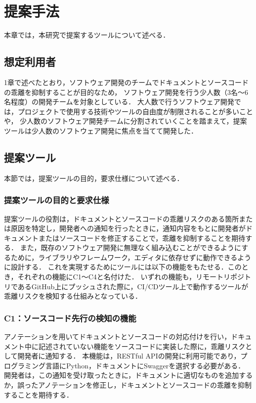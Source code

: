 \chapter{提案手法}
本章では，本研究で提案するツールについて述べる．

\section{想定利用者}
1章で述べたとおり，ソフトウェア開発のチームでドキュメントとソースコードの乖離を抑制することが目的なため，
ソフトウェア開発を行う少人数（3名〜6名程度）の開発チームを対象としている．
大人数で行うソフトウェア開発では，プロジェクトで使用する技術やツールの自由度が制限されることが多いことや，
少人数のソフトウェア開発チームに分割されていくことを踏まえて，提案ツールは少人数のソフトウェア開発に焦点を当てて開発した．

\section{提案ツール}
\label{tool}
本節では，提案ツールの目的，要求仕様について述べる．

\subsection{提案ツールの目的と要求仕様}
提案ツールの役割は，ドキュメントとソースコードの乖離リスクのある箇所または原因を特定し，開発者への通知を行ったときに，通知内容をもとに開発者がドキュメントまたはソースコードを修正することで，乖離を抑制することを期待する．
また，既存のソフトウェア開発に無理なく組み込むことができるようにするために，ライブラリやフレームワーク，エディタに依存せずに動作できるように設計する．
これを実現するためにツールには以下の機能をもたせる．このとき，それぞれの機能にC1〜C4と名付けた．
いずれの機能も，リモートリポジトリであるGitHub上にプッシュされた際に，CI/CDツール上で動作するツールが乖離リスクを検知する仕組みとなっている．

\subsection{C1：ソースコード先行の検知の機能}
\label{c1}
アノテーションを用いてドキュメントとソースコードの対応付けを行い，ドキュメント中に記述されていない機能をソースコードに実装した際に，乖離リスクとして開発者に通知する．
本機能は，RESTful APIの開発に利用可能であり，プログラミング言語にPython，ドキュメントにSwaggerを選択する必要がある．
開発者は，この通知を受け取ったときに，ドキュメントに適切なものを追加するか，誤ったアノテーションを修正し，ドキュメントとソースコードの乖離を抑制することを期待する．

